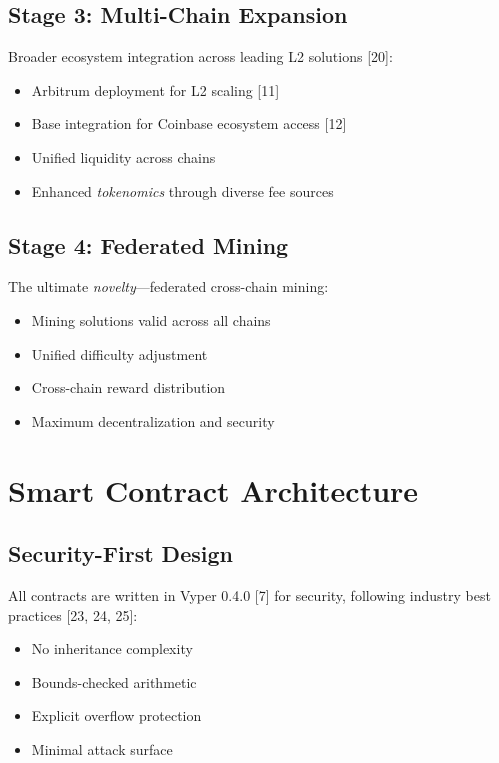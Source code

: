 \documentclass[11pt,a4paper]{article}
\begin{document}
\subsection{Stage 3: Multi-Chain Expansion}

Broader ecosystem integration across leading L2 solutions [20]:

\begin{itemize}
    \item Arbitrum deployment for L2 scaling [11]
    \item Base integration for Coinbase ecosystem access [12]
    \item Unified liquidity across chains
    \item Enhanced \textit{tokenomics} through diverse fee sources
\end{itemize}

\subsection{Stage 4: Federated Mining}

The ultimate \textit{novelty}---federated cross-chain mining:

\begin{itemize}
    \item Mining solutions valid across all chains
    \item Unified difficulty adjustment
    \item Cross-chain reward distribution
    \item Maximum decentralization and security
\end{itemize}

\section{Smart Contract Architecture}

\subsection{Security-First Design}

All contracts are written in Vyper 0.4.0 [7] for security, following industry best practices [23, 24, 25]:

\begin{itemize}
    \item No inheritance complexity
    \item Bounds-checked arithmetic
    \item Explicit overflow protection
    \item Minimal attack surface
\end{itemize}
\end{document}
